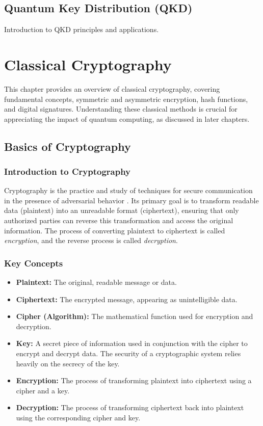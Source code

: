 \documentclass{report}
\begin{document}
\section{Quantum Key Distribution (QKD)}
Introduction to QKD principles and applications.
\chapter{Classical Cryptography}
\label{chap:classical-crypto}

This chapter provides an overview of classical cryptography, covering fundamental concepts, symmetric and asymmetric encryption, hash functions, and digital signatures.  Understanding these classical methods is crucial for appreciating the impact of quantum computing, as discussed in later chapters.

\section{Basics of Cryptography}
\label{sec:crypto-basics}

\subsection{Introduction to Cryptography}
\label{subsec:crypto-intro}

Cryptography is the practice and study of techniques for secure communication in the presence of adversarial behavior \cite{katz_lindell}.  Its primary goal is to transform readable data (plaintext) into an unreadable format (ciphertext), ensuring that only authorized parties can reverse this transformation and access the original information.  The process of converting plaintext to ciphertext is called \emph{encryption}, and the reverse process is called \emph{decryption}.

\subsection{Key Concepts}
\label{subsec:crypto-key-concepts}

\begin{itemize}
    \item \textbf{Plaintext:} The original, readable message or data.
    \item \textbf{Ciphertext:} The encrypted message, appearing as unintelligible data.
    \item \textbf{Cipher (Algorithm):} The mathematical function used for encryption and decryption.
    \item \textbf{Key:} A secret piece of information used in conjunction with the cipher to encrypt and decrypt data.  The security of a cryptographic system relies heavily on the secrecy of the key.
    \item \textbf{Encryption:} The process of transforming plaintext into ciphertext using a cipher and a key.
    \item \textbf{Decryption:} The process of transforming ciphertext back into plaintext using the corresponding cipher and key.
\end{itemize}
\end{document}
